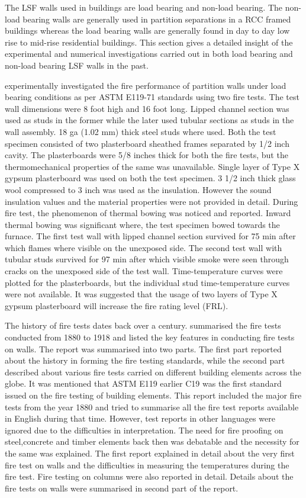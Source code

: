 The LSF walls used in buildings are load bearing and non-load bearing. The non-load bearing walls are generally used in partition separations in a RCC framed buildings whereas the load bearing walls are generally found in day to day low rise to mid-rise residential buildings. This section gives a detailed insight of the experimental and numerical investigations carried out in both load bearing and non-load bearing LSF walls in the past.

\citet{Son} experimentally investigated the fire performance of partition walls under load bearing conditions as per ASTM E119-71 standards using two fire tests. The test wall dimensions were 8 foot high and 16 foot long. Lipped channel section was used as studs in the former while the later used tubular sections as studs in the wall assembly. 18 ga (1.02 mm) thick steel studs where used. Both the test specimen consisted of two plasterboard sheathed frames separated by 1/2 inch cavity. The plasterboards were 5/8 inches thick for both the fire tests, but the thermomechanical properties of the same was unavailable. Single layer of Type X gypsum plasterboard was used on both the test specimen. 3 1/2 inch thick glass wool compressed to 3 inch was used as the insulation. However the sound insulation values and the material properties were not provided in detail. During fire test, the phenomenon of thermal bowing was noticed and reported. Inward thermal bowing was significant where, the test specimen bowed towards the furnace. The first test wall with lipped channel section survived for 75 min after which flames where visible on the unexposed side. The second test wall with tubular studs survived for 97 min after which visible smoke were seen through cracks on the unexposed side of the test wall. Time-temperature curves were plotted for the plasterboards, but the individual stud time-temperature curves were not available. It was suggested that the usage of two layers of Type X gypsum plasterboard will increase the fire rating level (FRL).   

The history of fire tests dates back over a century. \citet{Babrauskas1978} summarised the fire tests conducted from 1880 to 1918 and listed the key features in conducting fire tests on walls. The report was summarised into two parts. The first part reported about the history in forming the fire testing standards, while the second part described about various fire tests carried on different building elements across the globe. It was mentioned that ASTM E119 earlier C19 was the first standard issued on the fire testing of building elements. This report included the major fire tests from the year 1880 and tried to summarise all the fire test reports available in English during that time. However, test reports in other languages were ignored due to the difficulties in interpretation. The need for fire proofing on steel,concrete and timber elements back then was debatable and the necessity for the same was explained. The first report explained in detail about the very first fire test on walls and the difficulties in measuring the temperatures during the fire test. Fire testing on columns were also reported in detail. Details about the fire tests on walls were summarised in second part of the report.  

